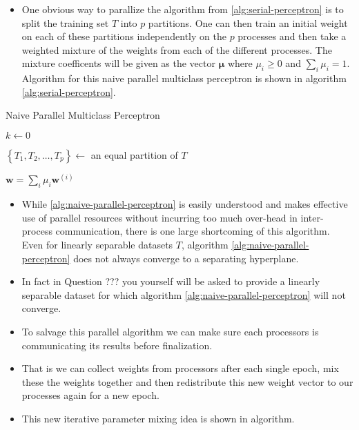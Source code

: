 \begin{itemize}
    \item One obvious way to parallize the algorithm from \ref{alg:serial-perceptron} is to split the training set $T$ into $p$ partitions. One can then train an initial weight on each of these partitions independently on the $p$ processes and then take a weighted mixture of the weights from each of the different processes. The mixture coefficents will be given as the vector $\bm{\mu}$ where $\mu_{i} \geq 0$ and $\sum_{i} \mu_{i} = 1$. Algorithm for this naive parallel multiclass perceptron is shown in algorithm \ref{alg:serial-perceptron}.
\end{itemize}
\begin{algorithm}[ht!!!]
    \caption{Naive Parallel Multiclass Perceptron}
    \label{alg:naive-parallel-perceptron}
    \SetAlgoLined
    \BlankLine
    $k \gets 0$\;
    
    $\left\lbrace T_{1} , T_{2}, \ldots , T_{p} \right\rbrace \gets$ an equal partition of $T$\;
    
    $\bm{w} = \sum_{i} \mu_{i} \bm{w}^{(i)}$\;
    
    \BlankLine
\end{algorithm}
\begin{itemize}
    \item While \ref{alg:naive-parallel-perceptron} is easily understood and makes effective use of parallel resources without incurring too much over-head in inter-process communication, there is one large shortcoming of this algorithm. Even for linearly separable datasets $T$, algorithm \ref{alg:naive-parallel-perceptron} does not always converge to a separating hyperplane.
    \item In fact in Question ??? you yourself will be asked to provide a linearly separable dataset for which algorithm \ref{alg:naive-parallel-perceptron} will not converge.
    \item To salvage this parallel algorithm we can make sure each processors is communicating its results before finalization.
    \item That is we can collect weights from processors after each single epoch, mix these the weights together and then redistribute this new weight vector to our processes again for a new epoch.
    \item This new iterative parameter mixing idea is shown in algorithm.
\end{itemize}
